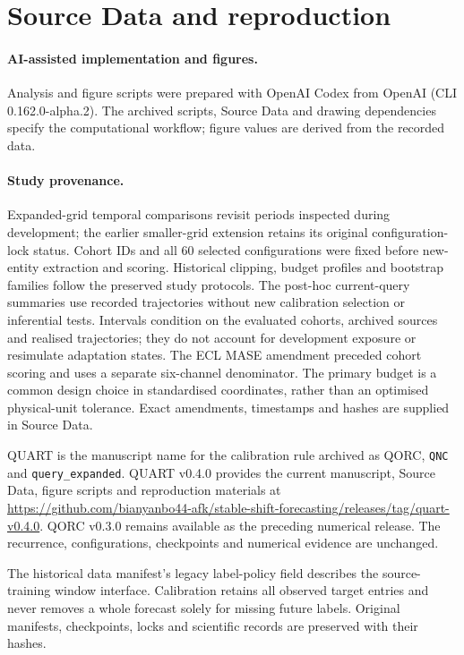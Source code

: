 \documentclass[11pt,a4paper]{article}
\begin{document}
\section{Source Data and reproduction}
\paragraph{AI-assisted implementation and figures.} Analysis and figure scripts were prepared with OpenAI Codex from OpenAI (CLI 0.162.0-alpha.2). The archived scripts, Source Data and drawing dependencies specify the computational workflow; figure values are derived from the recorded data.

\paragraph{Study provenance.} Expanded-grid temporal comparisons revisit periods inspected during development; the earlier smaller-grid extension retains its original configuration-lock status. Cohort IDs and all 60 selected configurations were fixed before new-entity extraction and scoring. Historical clipping, budget profiles and bootstrap families follow the preserved study protocols. The post-hoc current-query summaries use recorded trajectories without new calibration selection or inferential tests. Intervals condition on the evaluated cohorts, archived sources and realised trajectories; they do not account for development exposure or resimulate adaptation states. The ECL MASE amendment preceded cohort scoring and uses a separate six-channel denominator. The primary budget is a common design choice in standardised coordinates, rather than an optimised physical-unit tolerance. Exact amendments, timestamps and hashes are supplied in Source Data.


QUART is the manuscript name for the calibration rule archived as QORC, \texttt{QNC} and \texttt{query\_expanded}. QUART v0.4.0 provides the current manuscript, Source Data, figure scripts and reproduction materials at \url{https://github.com/bianyanbo44-afk/stable-shift-forecasting/releases/tag/quart-v0.4.0}. QORC v0.3.0 remains available as the preceding numerical release. The recurrence, configurations, checkpoints and numerical evidence are unchanged.

The historical data manifest's legacy label-policy field describes the source-training window interface. Calibration retains all observed target entries and never removes a whole forecast solely for missing future labels. Original manifests, checkpoints, locks and scientific records are preserved with their hashes.
\end{document}
